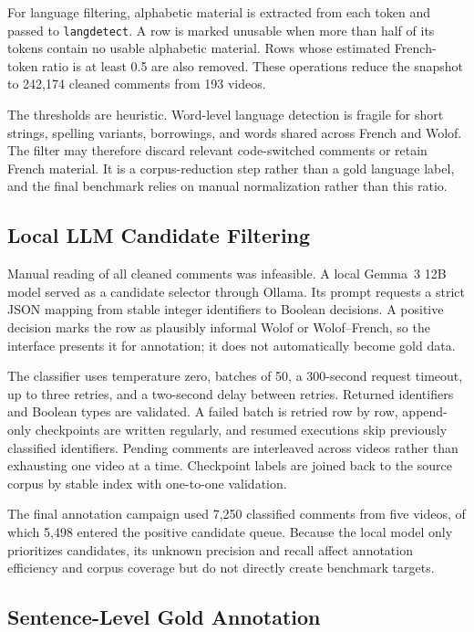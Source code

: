 \documentclass[12pt, a4paper, twoside, openany]{report}
\begin{document}
For language filtering, alphabetic material is extracted from each token and passed to \texttt{langdetect}. A row is marked unusable when more than half of its tokens contain no usable alphabetic material. Rows whose estimated French-token ratio is at least 0.5 are also removed. These operations reduce the snapshot to 242,174 cleaned comments from 193 videos.

The thresholds are heuristic. Word-level language detection is fragile for short strings, spelling variants, borrowings, and words shared across French and Wolof. The filter may therefore discard relevant code-switched comments or retain French material. It is a corpus-reduction step rather than a gold language label, and the final benchmark relies on manual normalization rather than this ratio.


\subsection{Local LLM Candidate Filtering}

Manual reading of all cleaned comments was infeasible. A local Gemma~3 12B model served as a candidate selector through Ollama. Its prompt requests a strict JSON mapping from stable integer identifiers to Boolean decisions. A positive decision marks the row as plausibly informal Wolof or Wolof--French, so the interface presents it for annotation; it does not automatically become gold data.

The classifier uses temperature zero, batches of 50, a 300-second request timeout, up to three retries, and a two-second delay between retries. Returned identifiers and Boolean types are validated. A failed batch is retried row by row, append-only checkpoints are written regularly, and resumed executions skip previously classified identifiers. Pending comments are interleaved across videos rather than exhausting one video at a time. Checkpoint labels are joined back to the source corpus by stable index with one-to-one validation.

The final annotation campaign used 7,250 classified comments from five videos, of which 5,498 entered the positive candidate queue. Because the local model only prioritizes candidates, its unknown precision and recall affect annotation efficiency and corpus coverage but do not directly create benchmark targets.


\subsection{Sentence-Level Gold Annotation}
\end{document}
